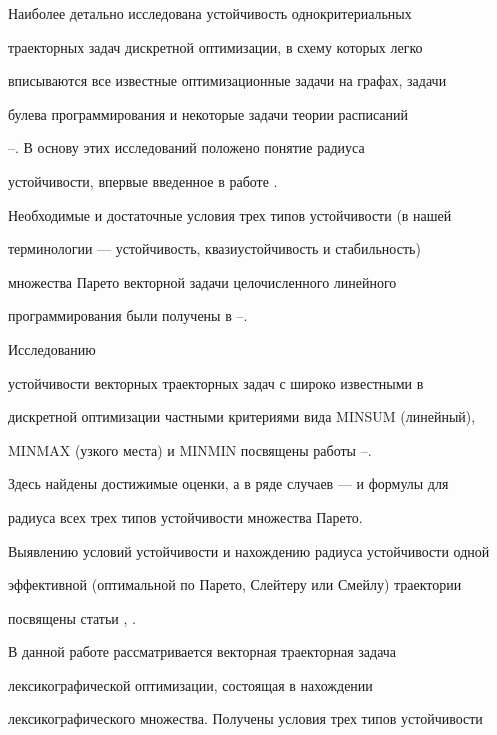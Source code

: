  


Наиболее детально исследована устойчивость однокритериальных 


траекторных задач дискретной оптимизации, в схему которых легко 


вписываются все известные оптимизационные задачи на графах, задачи 


булева программирования и некоторые задачи теории расписаний 


\cite{3}--\cite{7}. В основу этих исследований положено понятие радиуса 


устойчивости, впервые введенное в работе \cite{4}. 


 


Необходимые и достаточные условия трех типов устойчивости (в нашей 


терминологии --- устойчивость, квазиустойчивость и стабильность) 


множества Парето векторной задачи целочисленного линейного 


программирования были получены в \cite{8}--\cite{10}.





Исследованию 


устойчивости векторных траекторных задач с широко известными в 


дискретной оптимизации частными критериями вида MINSUM (линейный), 


MINMAX (узкого места) и MINMIN посвящены работы \cite{11}--\cite{14}. 


Здесь найдены достижимые оценки, а в ряде случаев --- и формулы для 


радиуса всех трех типов устойчивости множества Парето. 


 


Выявлению условий устойчивости и нахождению радиуса устойчивости одной 


эффективной (оптимальной по Парето, Слейтеру или Смейлу) траектории 


посвящены статьи \cite{15}, \cite{16}. 


 


В данной работе рассматривается векторная траекторная задача 


лексикографической оптимизации, состоящая в нахождении 


лексикографического множества. Получены условия трех типов устойчивости 


